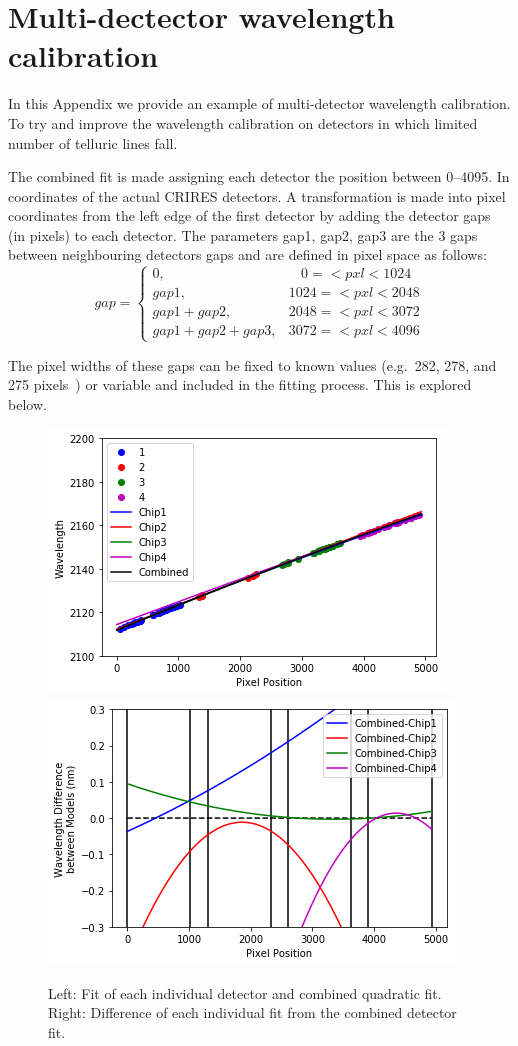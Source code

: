 
\chapter{Multi-dectector wavelength calibration} %
\label{appendix:wavelength_fitting}

In this Appendix we provide an example of multi-detector wavelength calibration.
To try and improve the wavelength calibration on detectors in which limited number of telluric lines fall.


The combined fit is made assigning each detector the position between 0--4095.
In coordinates of the actual CRIRES detectors.
A transformation is made into pixel coordinates from the left edge of the first detector by adding the detector gaps (in pixels) to each detector.
The parameters gap1, gap2, gap3 are the 3 gaps between neighbouring detectors gaps and are defined in pixel space as follows:
\[
gap =\begin{cases}
0,                      &~~~~0=<pxl<1024\\
gap1,                   &1024=<pxl<2048\\
gap1 + gap2,            &2048=<pxl<3072\\
gap1 + gap2 + gap3,     &3072=<pxl<4096
\end{cases}
\]

The pixel widths of these gaps can be fixed to known values (e.g.\ 282, 278, and 275 pixels~\citep{brogi_rotation_2016}) or variable and included in the fitting process.
This is explored below.




\begin{figure}
    \centering
    \includegraphics[width=0.45\linewidth]{./figures/appendix/multi_detector_fit}
    \includegraphics[width=0.45\linewidth]{./figures/appendix/multidector_fit_diff}
    \caption{Left: Fit of each individual detector and combined quadratic fit.
Right: Difference of each individual fit from the combined detector fit.}
    \label{fig:multidectorfitdiff}
\end{figure}


